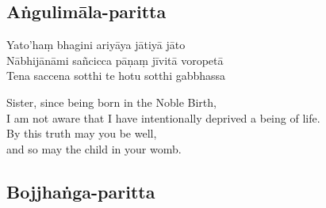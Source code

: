 \begin{paritta}
\subsection{Aṅgulimāla-paritta}
\label{yato-ham-bhagini}


\begin{paritta}
Yato'haṃ bhagini ariyāya jātiyā jāto\\
Nābhijānāmi sañcicca pāṇaṃ jīvitā voropetā\\
Tena saccena sotthi te hotu sotthi gabbhassa\\
\end{paritta}




\begin{english}
  Sister, since being born in the Noble Birth,\\
  I am not aware that I have intentionally deprived a being of life.\\
  By this truth may you be well,\\
  and so may the child in your womb.
\end{english}

\subsection{Bojjhaṅga-paritta}
\label{bojjhango}



\end{paritta}
